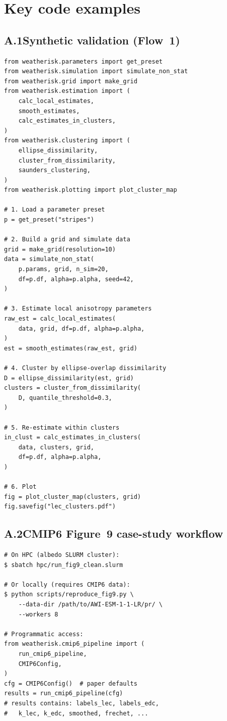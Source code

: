 \documentclass[preprint,12pt,a4paper]{elsarticle}
\newcommand{\rev}[1]{{#1}}
\newcommand{\revb}[1]{{#1}}
\begin{document}
\section{Key code examples}
\label{app:code}

\subsection{A.1\quad Synthetic validation (Flow~1)}

\begin{lstlisting}[caption={Complete synthetic validation
  workflow.}, label=lst:app-validate]
from weatherisk.parameters import get_preset
from weatherisk.simulation import simulate_non_stat
from weatherisk.grid import make_grid
from weatherisk.estimation import (
    calc_local_estimates,
    smooth_estimates,
    calc_estimates_in_clusters,
)
from weatherisk.clustering import (
    ellipse_dissimilarity,
    cluster_from_dissimilarity,
    saunders_clustering,
)
from weatherisk.plotting import plot_cluster_map

# 1. Load a parameter preset
p = get_preset("stripes")

# 2. Build a grid and simulate data
grid = make_grid(resolution=10)
data = simulate_non_stat(
    p.params, grid, n_sim=20,
    df=p.df, alpha=p.alpha, seed=42,
)

# 3. Estimate local anisotropy parameters
raw_est = calc_local_estimates(
    data, grid, df=p.df, alpha=p.alpha,
)
est = smooth_estimates(raw_est, grid)

# 4. Cluster by ellipse-overlap dissimilarity
D = ellipse_dissimilarity(est, grid)
clusters = cluster_from_dissimilarity(
    D, quantile_threshold=0.3,
)

# 5. Re-estimate within clusters
in_clust = calc_estimates_in_clusters(
    data, clusters, grid,
    df=p.df, alpha=p.alpha,
)

# 6. Plot
fig = plot_cluster_map(clusters, grid)
fig.savefig("lec_clusters.pdf")
\end{lstlisting}

\rev{\subsection{A.2\quad CMIP6 Figure~9 \revb{case-study workflow}}}

\begin{lstlisting}[caption={\revb{Running the Figure~9 case study} on HPC or
  locally.}, label=lst:app-fig9]
# On HPC (albedo SLURM cluster):
$ sbatch hpc/run_fig9_clean.slurm

# Or locally (requires CMIP6 data):
$ python scripts/reproduce_fig9.py \
    --data-dir /path/to/AWI-ESM-1-1-LR/pr/ \
    --workers 8

# Programmatic access:
from weatherisk.cmip6_pipeline import (
    run_cmip6_pipeline,
    CMIP6Config,
)
cfg = CMIP6Config()  # paper defaults
results = run_cmip6_pipeline(cfg)
# results contains: labels_lec, labels_edc,
#   k_lec, k_edc, smoothed, frechet, ...
\end{lstlisting}
\end{document}
